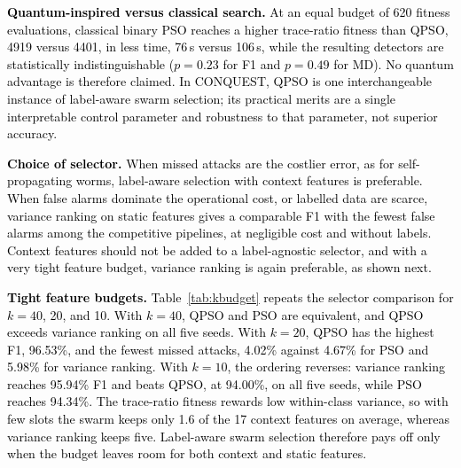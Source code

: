 \documentclass[conference]{IEEEtran}
\begin{document}
\textcolor{black}{\textbf{Quantum-inspired versus classical
search.} At an equal budget of 620 fitness evaluations, classical
binary PSO reaches a higher trace-ratio fitness than QPSO, 4919
versus 4401, in less time, 76\,s versus 106\,s, while the resulting
detectors are statistically indistinguishable ($p=0.23$ for F1 and
$p=0.49$ for MD). No quantum advantage is therefore claimed. In
CONQUEST, QPSO is one interchangeable instance of label-aware swarm
selection; its practical merits are a single interpretable control
parameter and robustness to that parameter, not superior accuracy.}

\textcolor{black}{\textbf{Choice of selector.} When
missed attacks are the costlier error, as for self-propagating worms,
label-aware selection with context features is preferable. When false
alarms dominate the operational cost, or labelled data are scarce,
variance ranking on static features gives a comparable F1 with the
fewest false alarms among the competitive pipelines, at negligible
cost and without labels. Context features should not be added to a
label-agnostic selector, and with a very tight feature budget,
variance ranking is again preferable, as shown next.}

\textcolor{black}{\textbf{Tight feature budgets.}
Table~\ref{tab:kbudget} repeats the selector comparison for $k=40$, 20,
and 10. With $k=40$, QPSO and PSO are equivalent, and QPSO exceeds
variance ranking on all five seeds. With $k=20$, QPSO has the highest
F1, 96.53\%, and the fewest missed attacks, 4.02\% against 4.67\% for
PSO and 5.98\% for variance ranking. With $k=10$, the ordering
reverses: variance ranking reaches 95.94\% F1 and beats QPSO, at
94.00\%, on all five seeds, while PSO reaches 94.34\%. The trace-ratio
fitness rewards low within-class variance, so with few slots the
swarm keeps only 1.6 of the 17 context features on average, whereas
variance ranking keeps five. Label-aware swarm selection therefore
pays off only when the budget leaves room for both context and static
features.}
\end{document}
